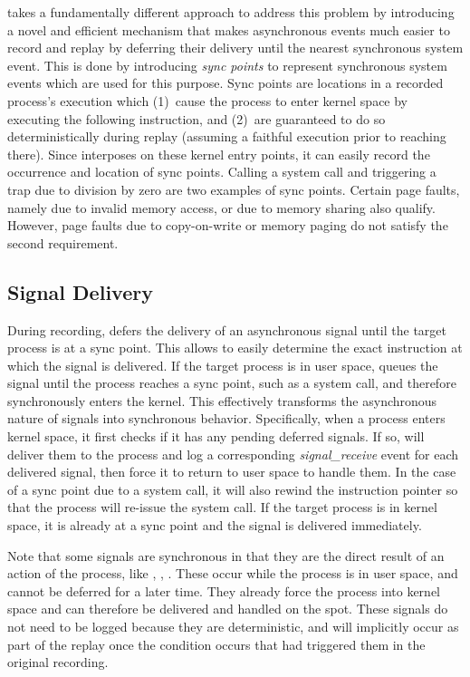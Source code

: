 \begin{table}[]
\scribe{} takes a fundamentally different approach to address this
problem by introducing a novel and efficient mechanism that makes
asynchronous events much easier to record and replay by deferring
their delivery until the nearest synchronous system event.  This is
done by introducing {\em sync points} to represent synchronous system
events which are used for this purpose.  Sync points
are locations in a recorded process's execution which (1)~cause the
process to enter kernel space by executing the following instruction,
and (2)~are guaranteed to do so deterministically during replay
(assuming a faithful execution prior to reaching there). Since
\scribe{} interposes on these kernel entry points, it can easily
record the occurrence and location of sync points. Calling a system
call and triggering a trap due to division by zero are two examples of
sync points. Certain page faults, namely due to invalid memory access,
or due to memory sharing also qualify.
However, page faults due to copy-on-write or memory paging do not
satisfy the second requirement.

\subsection{Signal Delivery}

During recording, \scribe{} defers the delivery of an asynchronous
signal until the target process is at a sync point.  This allows
\scribe{} to easily determine the exact instruction at which the signal
is delivered.  If the target process is in user space, \scribe{} queues
the signal
until the process reaches a sync
point, such as a system call, and therefore synchronously enters the
kernel.  This effectively transforms the asynchronous nature of
signals into synchronous behavior.  Specifically, when a process
enters kernel space, it first checks if it has any pending deferred
signals.  If so, \scribe{} will deliver them to the process and log a
corresponding {\em signal\_receive} event for each delivered signal,
then force it to return to user space to handle them.  In the case of a
sync point due to a system call, it will also rewind the instruction
pointer so that the process will re-issue the system call. 
If the target process is in kernel space, it is already at a sync point
and the signal is delivered immediately. 

Note that some signals are synchronous in that they are the direct
result of an action of the process, like ,
, .  These occur while the process is in
user space, and cannot be deferred for a later time.  They already
force the process into kernel space and can therefore be delivered and
handled on the spot.  These signals do not need to be logged because
they are deterministic, and will implicitly occur as part of the
replay once the condition occurs that had triggered them in the
original recording.


\end{table}
